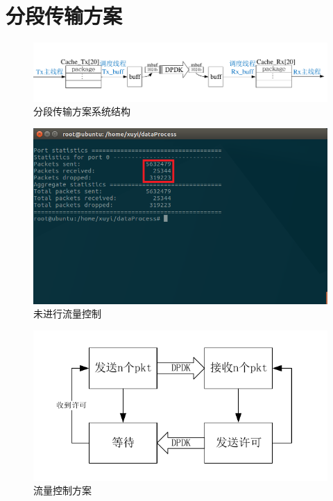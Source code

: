 \documentclass{article}
\begin{document}
\section{分段传输方案}
\begin{figure}[H]
	\centering
	\includegraphics[width = \textwidth]{frame_sys.pdf}
	\caption{分段传输方案系统结构}
\end{figure}
\begin{figure}[H]
	\centering
	\includegraphics[width = .8\textwidth]{drop_result.png}
	\caption{未进行流量控制}
\end{figure}
\begin{figure}[H]
	\centering
	\includegraphics[width = .6\textwidth]{flow_traffic.pdf}
	\caption{流量控制方案}
\end{figure}
\end{document}

